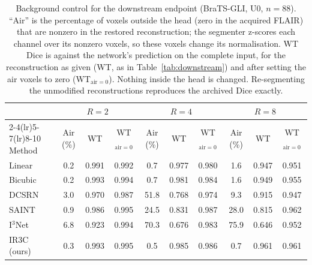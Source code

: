\begin{table}[pos=t]
\caption{Background control for the downstream endpoint (BraTS-GLI, U0, $n=88$). ``Air'' is the percentage of voxels outside the head (zero in the acquired FLAIR) that are nonzero in the restored reconstruction; the segmenter z-scores each channel over its nonzero voxels, so these voxels change its normalisation. WT Dice is against the network's prediction on the complete input, for the reconstruction as given (WT, as in Table~\ref{tab:downstream}) and after setting the air voxels to zero (WT$_{\mathrm{air}=0}$). Nothing inside the head is changed. Re-segmenting the unmodified reconstructions reproduces the archived Dice exactly.}
\label{tab:bgmask}
\small
\begin{tabular*}{\textwidth}{@{\extracolsep{\fill}}lccccccccc@{}}
\toprule
 & \multicolumn{3}{c}{$R=2$} & \multicolumn{3}{c}{$R=4$} & \multicolumn{3}{c}{$R=8$} \\
\cmidrule(lr){2-4}\cmidrule(lr){5-7}\cmidrule(lr){8-10}
Method & Air (\%) & WT & WT$_{\mathrm{air}=0}$ & Air (\%) & WT & WT$_{\mathrm{air}=0}$ & Air (\%) & WT & WT$_{\mathrm{air}=0}$ \\
\midrule
Linear & 0.2 & 0.991 & 0.992 & 0.7 & 0.977 & 0.980 & 1.6 & 0.947 & 0.951 \\
Bicubic & 0.2 & 0.993 & 0.994 & 0.7 & 0.981 & 0.984 & 1.6 & 0.949 & 0.955 \\
DCSRN & 3.0 & 0.970 & 0.987 & 51.8 & 0.768 & 0.974 & 9.3 & 0.915 & 0.947 \\
SAINT & 0.9 & 0.986 & 0.995 & 24.5 & 0.831 & 0.987 & 28.0 & 0.815 & 0.962 \\
I$^3$Net & 6.8 & 0.923 & 0.994 & 70.3 & 0.676 & 0.983 & 75.9 & 0.646 & 0.952 \\
IR3C (ours) & 0.3 & 0.993 & 0.995 & 0.5 & 0.985 & 0.986 & 0.7 & 0.961 & 0.961 \\
\bottomrule
\end{tabular*}
\end{table}
